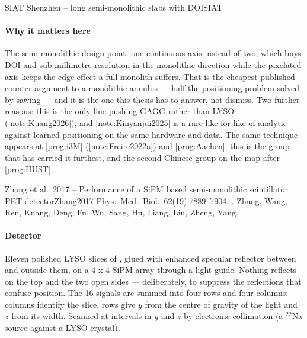 \begin{programnote}{SIAT Shenzhen -- long semi-monolithic slabs with DOI}{SIAT}
\paragraph{Why it matters here}
The semi-monolithic design point: one continuous axis instead of two, which
buys DOI and sub-millimetre resolution in the monolithic direction while the
pixelated axis keeps the edge effect a full monolith suffers. That is the
cheapest published counter-argument to a monolithic annulus --- half the
positioning problem solved by sawing --- and it is the one this thesis has to
answer, not dismiss. Two further reasons: this is the only line pushing GAGG
rather than LYSO (\ref{note:Kuang2026}), and \ref{note:Kinyanjui2025}
is a rare like-for-like of analytic against learned positioning on the same
hardware and data. The same technique appears at
\ref{prog:i3M} (\ref{note:Freire2022a}) and \ref{prog:Aachen}; this is the
group that has carried it furthest, and the second Chinese group on the map
after \ref{prog:HUST}.

\begin{papernote}{Zhang et al.\ 2017 -- Performance of a SiPM based semi-monolithic scintillator PET detector}{Zhang2017}
Phys.\ Med.\ Biol.\ 62(19):7889--7904, . Zhang,
Wang, Ren, Kuang, Deng, Fu, Wu, Sang, Hu, Liang, Liu, Zheng, Yang.

\paragraph{Detector}
Eleven polished LYSO slices of , glued with
enhanced specular reflector between and outside them, on a 4 x 4 SiPM array
through a  light guide. Nothing reflects on the top and the two open
sides --- deliberately, to suppress the reflections that confuse position. The
16 signals are summed into four rows and four columns: columns identify the
slice, rows give $y$ from the centre of gravity of the light and $z$ from its
width. Scanned at  intervals in $y$ and $z$ by electronic collimation (a
 $^{22}$Na source against a  LYSO
crystal).


\end{papernote}
\end{programnote}
